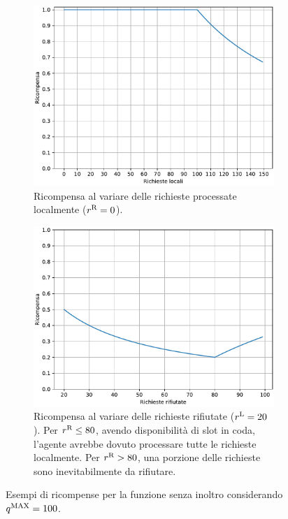 \begin{figure}
    \centering

    \begin{subfigure}{.7\textwidth}
        \centering
        \includegraphics[width=\linewidth]{assets/4/reward_asym_no_forward_local_reqs.pdf}
        \caption{Ricompensa al variare delle richieste processate localmente ($r^\textnormal{R} = 0$).}
        \label{fig:4_reward_asym_no_fw_only_local}
    \end{subfigure}

    \begin{subfigure}{.7\textwidth}
        \centering
        \includegraphics[width=\linewidth]{assets/4/reward_asym_no_forward_total_reject.pdf}
        \caption{Ricompensa al variare delle richieste rifiutate (${r^\textnormal{L} = 20}$). Per $r^\textnormal{R} \le 80$, avendo disponibilità di slot in coda, l'agente avrebbe dovuto processare tutte le richieste localmente. Per $r^\textnormal{R} > 80$, una porzione delle richieste sono inevitabilmente da rifiutare.}
        \label{fig:4_reward_asym_no_fw_total_reject}
    \end{subfigure}
    
    \caption[Esempi di ricompense per la funzione senza inoltro]{Esempi di ricompense per la funzione senza inoltro considerando $q^\textnormal{MAX} = 100$.}
    \label{fig:4_reward_asym_no_fw}
\end{figure}

